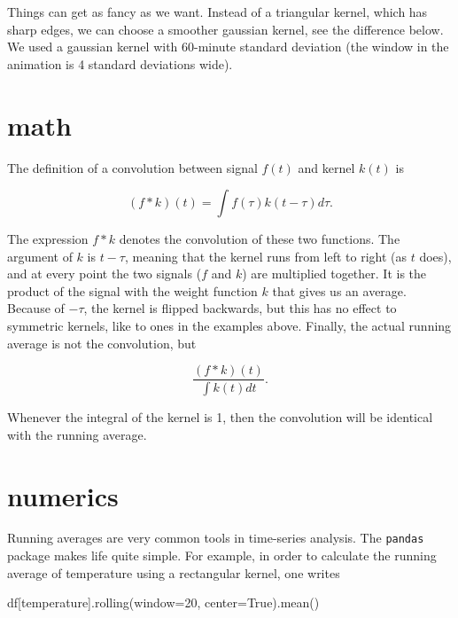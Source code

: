 \documentclass[
  letterpaper,
  DIV=11,
  numbers=noendperiod,
  oneside]{scrreprt}
\newenvironment{Shaded}{\begin{snugshade}}{\end{snugshade}}
\newcommand{\NormalTok}[1]{\textcolor[rgb]{0.00,0.23,0.31}{#1}}
\newcommand{\OperatorTok}[1]{\textcolor[rgb]{0.37,0.37,0.37}{#1}}
\newcommand{\StringTok}[1]{\textcolor[rgb]{0.13,0.47,0.30}{#1}}
\newcommand{\VariableTok}[1]{\textcolor[rgb]{0.07,0.07,0.07}{#1}}
\begin{document}
Things can get as fancy as we want. Instead of a triangular kernel,
which has sharp edges, we can choose a smoother gaussian kernel, see the
difference below. We used a gaussian kernel with 60-minute standard
deviation (the window in the animation is 4 standard deviations wide).

\hypertarget{math}{%
\section{math}\label{math}}

The definition of a convolution between signal \(f(t)\) and kernel
\(k(t)\) is

\[
(f * k)(t) = \int f(\tau)k(t-\tau)d\tau.
\]

The expression \(f*k\) denotes the convolution of these two functions.
The argument of \(k\) is \(t-\tau\), meaning that the kernel runs from
left to right (as \(t\) does), and at every point the two signals (\(f\)
and \(k\)) are multiplied together. It is the product of the signal with
the weight function \(k\) that gives us an average. Because of
\(-\tau\), the kernel is flipped backwards, but this has no effect to
symmetric kernels, like to ones in the examples above. Finally, the
actual running average is not the convolution, but

\[
\frac{(f * k)(t)}{\displaystyle \int k(t)dt}.
\]

Whenever the integral of the kernel is 1, then the convolution will be
identical with the running average.

\hypertarget{numerics}{%
\section{numerics}\label{numerics}}

Running averages are very common tools in time-series analysis. The
\texttt{pandas} package makes life quite simple. For example, in order
to calculate the running average of temperature using a rectangular
kernel, one writes

\begin{Shaded}
\begin{Highlighting}[]
\NormalTok{df[}\StringTok{\textquotesingle{}temperature\textquotesingle{}}\NormalTok{].rolling(window}\OperatorTok{=}\StringTok{\textquotesingle{}20\textquotesingle{}}\NormalTok{, center}\OperatorTok{=}\VariableTok{True}\NormalTok{).mean()}
\end{Highlighting}
\end{Shaded}
\end{document}
